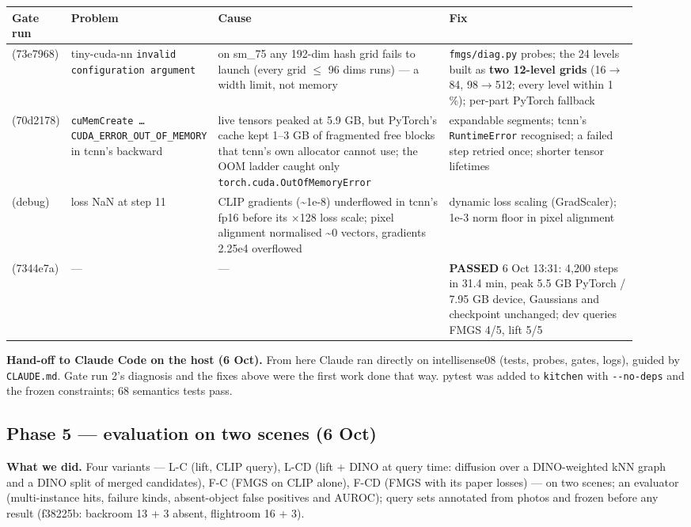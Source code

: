 \documentclass[11pt,a4paper]{article}
\newcommand{\code}[1]{\texttt{#1}}
\begin{document}
\begin{center}\small
\begin{tabular}{@{}>{\raggedright\arraybackslash}p{0.094\linewidth}>{\raggedright\arraybackslash}p{0.124\linewidth}>{\raggedright\arraybackslash}p{0.384\linewidth}>{\raggedright\arraybackslash}p{0.321\linewidth}@{}}
\toprule
\textbf{Gate run} & \textbf{Problem} & \textbf{Cause} & \textbf{Fix} \\
\midrule
1 (73e7968) & tiny-cuda-nn \code{invalid configuration argument} & on sm\_75 any 192-dim hash grid fails to launch (every grid $\le$ 96 dims runs) — a width limit, not memory & \code{fmgs/\allowbreak{}diag.py} probes; the 24 levels built as \textbf{two 12-level grids} (16$\rightarrow$84, 98$\rightarrow$512; every level within 1 \%); per-part PyTorch fallback \\
2 (70d2178) & \code{cuMemCreate … CUDA\_\allowbreak{}ERROR\_\allowbreak{}OUT\_\allowbreak{}OF\_\allowbreak{}MEMORY} in tcnn's backward & live tensors peaked at 5.9 GB, but PyTorch's cache kept 1–3 GB of fragmented free blocks that tcnn's own allocator cannot use; the OOM ladder caught only \code{torch.cuda.OutOfMemoryError} & expandable segments; tcnn's \code{RuntimeError} recognised; a failed step retried once; shorter tensor lifetimes \\
(debug) & loss NaN at step 11 & CLIP gradients (\textasciitilde{}1e-8) underflowed in tcnn's fp16 before its $\times$128 loss scale; pixel alignment normalised \textasciitilde{}0 vectors, gradients 2.25e4 overflowed & dynamic loss scaling (GradScaler); 1e-3 norm floor in pixel alignment \\
3 (7344e7a) & — & — & \textbf{PASSED} 6 Oct 13:31: 4,200 steps in 31.4 min, peak 5.5 GB PyTorch / 7.95 GB device, Gaussians and checkpoint unchanged; dev queries FMGS 4/5, lift 5/5 \\
\bottomrule
\end{tabular}
\end{center}
\textbf{Hand-off to Claude Code on the host (6 Oct).} From here Claude ran directly on intellisense08 (tests, probes, gates, logs), guided by \code{CLAUDE.md}. Gate run 2's diagnosis and the fixes above were the first work done that way. pytest was added to \code{kitchen} with \code{-{}-no-deps} and the frozen constraints; 68 semantics tests pass.

\subsection{Phase 5 — evaluation on two scenes (6 Oct)}
\textbf{What we did.} Four variants — L-C (lift, CLIP query), L-CD (lift + DINO at query time: diffusion over a DINO-weighted kNN graph and a DINO split of merged candidates), F-C (FMGS on CLIP alone), F-CD (FMGS with its paper losses) — on two scenes; an evaluator (multi-instance hits, failure kinds, absent-object false positives and AUROC); query sets annotated from photos and frozen before any result (f38225b: backroom 13 + 3 absent, flightroom 16 + 3).
\end{document}

